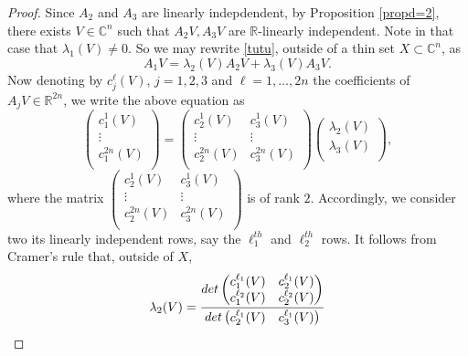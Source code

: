 \documentclass[10pt,a4paper]{amsart}
\newcommand{\C}{\mathbb C}
\newcommand{\R}{\mathbb R}
\numberwithin{equation}{section}
\begin{document}
\begin{proof}
Since $A_2$ and $A_3$ are linearly indepdendent, by   Proposition \ref{propd=2}, there exists $V \in \C^n$ such that $A_2V,A_3V$ are $\R$-linearly independent. Note in that case that $\lambda_1(V) \neq 0$. So we may rewrite \eqref{tutu}, outside of a thin set $X \subset \C^n$, as  
 $$A_1V=\lambda_2(V)A_2V+\lambda_3(V)A_3V.$$
 Now denoting  by $c_j^\ell(V)$, $j=1,2,3$ and $\ell=1,\ldots,2n$ the coefficients of $A_jV \in \R^{2n}$, we write the above equation as 
$$ \begin{pmatrix} 
c_1^1(V) \\ 
\vdots \\ 
c_1^{2n}(V) \\ 
\end{pmatrix} = \begin{pmatrix} 
c_2^1(V) & c_3^1(V)  \\ 
\vdots & \vdots\\ 
c_2^{2n}(V) & c_3^{2n}(V)  \\ 
\end{pmatrix} \begin{pmatrix} 
\lambda_2(V) \\ 
\lambda_3(V) \\ 
\end{pmatrix},$$
where the matrix  $\begin{pmatrix} 
c_2^1(V) & c_3^1(V)  \\ 
\vdots & \vdots\\ 
c_2^{2n}(V) & c_3^{2n}(V)  \\ 
\end{pmatrix}$ is of rank $2.$
Accordingly, we consider two its linearly independent rows, say the 
$\ell_1^{th}$ and $\ell_2^{th}$ rows. It follows from Cramer's rule that, outside of $X$,
$$\lambda_2(V)=\frac{{\rm det}\begin{pmatrix} 
c_1^{\ell_1}(V) & c_2^{\ell_1}(V)\\
c_1^{\ell_2}(V) & c_2^{\ell_2}(V)\\ 
\end{pmatrix}}{{\rm det}\begin{pmatrix} 
c_2^{\ell_1}(V) & c_3^{\ell_1}(V)\\

\end{pmatrix}}$$
\end{proof}
\end{document}
